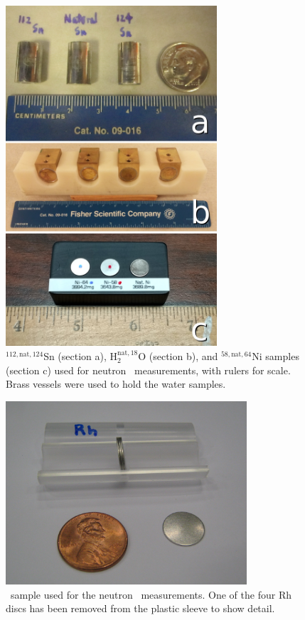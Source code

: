 \begin{figure}[tb]
    \centering
    \includegraphics[width=0.7\textwidth]{figures/AllIsotopicSamples.jpg}
    \caption[${^{112,\text{nat},124}}$Sn, $^{{\text{nat}, 18}}$O, and ${^{58,\text{nat},64}}$Ni
    samples used for neutron \tot\ measurements]
    {
        ${^{112,\text{nat},124}}$Sn (section a), H$_2^{{\text{nat}, 18}}$O (section
        b), and ${^{58,\text{nat},64}}$Ni
        samples (section c) used for neutron \tot\ measurements, with rulers for
        scale. Brass vessels were used to hold the water samples.
    }
    \label{SamplesImage}
\end{figure}

\begin{figure}[tb]
    \centering
    \includegraphics[width=0.8\textwidth]{figures/RhodiumSample.jpg}
    \caption[\rhThree\ sample used for the neutron \tot\ measurements]
    {\rhThree\ sample used for the neutron \tot\ measurements. One of
    the four Rh discs has been removed from the plastic sleeve to show detail.}
    \label{RhodiumSample}
\end{figure}

